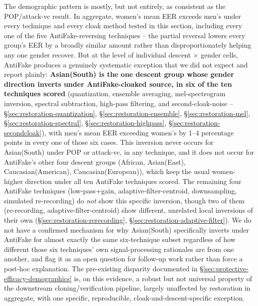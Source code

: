 \documentclass[11pt]{article}
\begin{document}
The demographic pattern is mostly, but not entirely, as consistent as
the POP/attack-vc result. In aggregate, women's mean EER exceeds men's
under every technique and every cloak method tested in this section,
including every one of the five AntiFake-reversing techniques -- the
partial reversal lowers every group's EER by a broadly similar amount
rather than disproportionately helping any one gender recover. But at
the level of individual descent $\times$ gender cells, AntiFake produces
a genuinely systematic exception that we did not expect and report
plainly: \textbf{Asian(South) is the one descent group whose gender
direction inverts under AntiFake-cloaked source, in six of the ten
techniques scored} (quantization, ensemble averaging, mel-spectrogram
inversion, spectral subtraction, high-pass filtering, and
second-cloak-noise -- \S\ref{sec:restoration-quantization},
\S\ref{sec:restoration-ensemble}, \S\ref{sec:restoration-mel},
\S\ref{sec:restoration-spectral}, \S\ref{sec:restoration-highpass},
\S\ref{sec:restoration-secondcloak}), with men's mean EER exceeding
women's by 1--4 percentage points in every one of those six cases. This
inversion never occurs for Asian(South) under POP or attack-vc, in any
technique, and it does not occur for AntiFake's other four descent
groups (African, Asian(East), Caucasian(American), Caucasian(European)),
which keep the usual women-higher direction under all ten AntiFake
techniques scored. The remaining four AntiFake techniques
(low-pass+gain, adaptive-filter-centroid, downsampling, simulated
re-recording) do \emph{not} show this specific inversion, though two of
them (re-recording, adaptive-filter-centroid) show different,
unrelated local inversions of their own
(\S\ref{sec:restoration-rerecording},
\S\ref{sec:restoration-adaptive-filter}). We do not have a confirmed
mechanism for why Asian(South) specifically inverts under AntiFake for
almost exactly the same six-technique subset regardless of how
different those six techniques' own signal-processing rationales are
from one another, and flag it as an open question for follow-up work
rather than force a post-hoc explanation. The pre-existing disparity
documented in \S\ref{sec:protective-efficacy-demographics} is, on this
evidence, a robust but not universal property of the downstream
cloning/verification pipeline, largely unaffected by restoration in
aggregate, with one specific, reproducible, cloak-and-descent-specific
exception.
\end{document}
